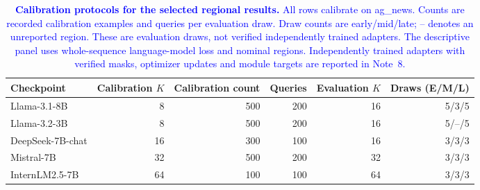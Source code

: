 \begingroup\color{blue}
\begin{table}[t]
\centering
\color{blue}
\caption{\textcolor{blue}{\textbf{Calibration protocols for the selected regional results.} All rows calibrate on ag\_news. Counts are recorded calibration examples and queries per evaluation draw. Draw counts are early/mid/late; -- denotes an unreported region. These are evaluation draws, not verified independently trained adapters. The descriptive panel uses whole-sequence language-model loss and nominal regions. Independently trained adapters with verified masks, optimizer updates and module targets are reported in Note~8.}}
\label{stab:protocols}
\footnotesize\color{blue}
\setlength{\tabcolsep}{4pt}
\begin{tabular}{lrrrrr}
\toprule
Checkpoint & Calibration $K$ & Calibration count & Queries & Evaluation $K$ & Draws (E/M/L) \\
\midrule
Llama-3.1-8B & 8 & 500 & 200 & 16 & 5/3/5 \\
Llama-3.2-3B & 8 & 500 & 200 & 16 & 5/--/5 \\
DeepSeek-7B-chat & 16 & 300 & 100 & 16 & 3/3/3 \\
Mistral-7B & 32 & 500 & 200 & 32 & 3/3/3 \\
InternLM2.5-7B & 64 & 100 & 100 & 64 & 3/3/3 \\
\bottomrule
\end{tabular}
\end{table}
\endgroup

